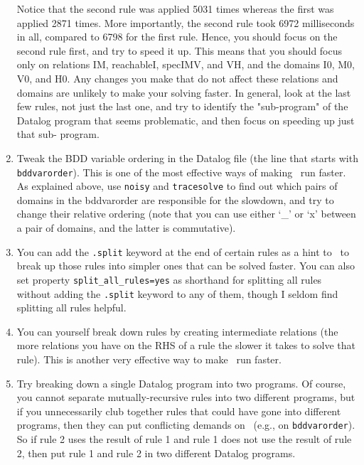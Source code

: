 \begin{enumerate}
Notice that the second rule was applied 5031 times whereas the first
was applied 2871 times.  More importantly, the second rule took 6972
milliseconds in all, compared to 6798 for the first rule.  Hence, you
should focus on the second rule first, and try to speed it up.  This
means that you should focus only on relations IM, reachableI, specIMV,
and VH, and the domains I0, M0, V0, and H0.  Any changes you make that
do not affect these relations and domains are unlikely to make your
solving faster.  In general, look at the last few rules, not just the
last one, and try to identify the "sub-program" of the Datalog program
that seems problematic, and then focus on speeding up just that sub-
program.

\item
Tweak the BDD variable ordering in the Datalog file (the line that
starts with \verb+bddvarorder+).  This is one of the most
effective ways of making \bddbddb\ run faster.  As explained above, use
\verb+noisy+ and \verb+tracesolve+ to find out which pairs of domains in the
bddvarorder are responsible for the slowdown, and try to change their
relative ordering (note that you can use either `\_' or `x' between a pair
of domains, and the latter is commutative).

\item
You can add the \verb+.split+ keyword at the end of certain rules as a
hint to \bddbddb\ to break up those rules into simpler ones that can be
solved faster.  You can also set property \verb+split_all_rules=yes+ as shorthand
for splitting all rules without adding the \verb+.split+ keyword to any of
them, though I seldom find splitting all rules helpful.

\item
You can yourself break down rules by creating intermediate relations (the more
relations you have on the RHS of a rule the slower it takes to solve
that rule).  This is another very effective way to make \bddbddb\ run
faster.

\item
Try breaking down a single Datalog program into two programs.  Of
course, you cannot separate mutually-recursive rules into two
different programs, but if you unnecessarily club
together rules that could have gone into different programs, then they
can put conflicting demands on \bddbddb\ (e.g., on \verb+bddvarorder+).
So if rule 2 uses the result of rule 1 and rule 1 does not use the result of
rule 2, then put rule 1 and rule 2 in two different Datalog programs.


\end{enumerate}
